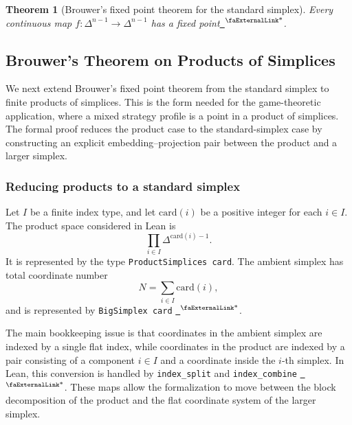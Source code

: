 \documentclass{article}
\newtheorem{theorem}{Theorem}[section]
\theoremstyle{definition}
\newcommand{\extlink}{~\ensuremath{{}^\text{\faExternalLink*}}}
\begin{document}
\begin{theorem}[Brouwer's fixed point theorem for the standard simplex]
Every continuous map $f:\Delta^{n-1}\to\Delta^{n-1}$ has a fixed point\href{https://github.com/Solo-ary/Game-Theory-Formalization/blob/7b49d5267d4f26b17bdf071250880b63e96999b6/Brouwer/Gametheory/Brouwer.lean#L710-L791}{\extlink}.
\end{theorem}




\subsection{Brouwer's Theorem on Products of Simplices}
\label{subsec:brouwer-product}

We next extend Brouwer's fixed point theorem from the standard simplex to finite products of simplices. This is the form needed for the game-theoretic application, where a mixed strategy profile is a point in a product of simplices. The formal proof reduces the product case to the standard-simplex case by constructing an explicit embedding--projection pair between the product and a larger simplex.

\subsubsection{Reducing products to a standard simplex}

Let $I$ be a finite index type, and let $\mathrm{card}(i)$ be a positive integer for each $i\in I$. The product space considered in Lean is
$$
\prod_{i\in I}\Delta^{\mathrm{card}(i)-1}.
$$
It is represented by the type \texttt{ProductSimplices card}. The ambient simplex has total coordinate number
$$
N=\sum_{i\in I}\mathrm{card}(i),
$$
and is represented by \texttt{BigSimplex card}
\href{https://github.com/Solo-ary/Game-Theory-Formalization/blob/7b49d5267d4f26b17bdf071250880b63e96999b6/Brouwer/Gametheory/Brouwer_product.lean#L8-L18}{\extlink}.

The main bookkeeping issue is that coordinates in the ambient simplex are indexed by a single flat index, while coordinates in the product are indexed by a pair consisting of a component $i\in I$ and a coordinate inside the $i$-th simplex. In Lean, this conversion is handled by \texttt{index\_split} and \texttt{index\_combine}
\href{https://github.com/Solo-ary/Game-Theory-Formalization/blob/7b49d5267d4f26b17bdf071250880b63e96999b6/Brouwer/Gametheory/Brouwer_product.lean#L105-L203}{\extlink}.
These maps allow the formalization to move between the block decomposition of the product and the flat coordinate system of the larger simplex.
\end{document}
